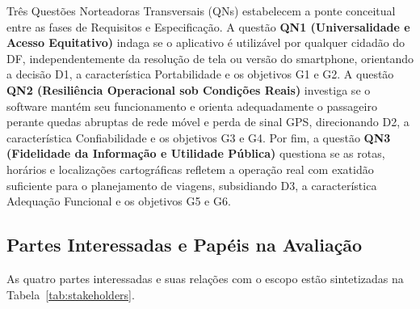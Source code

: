 \documentclass[11pt,a4paper]{article}
\begin{document}
Três Questões Norteadoras Transversais (QNs) estabelecem a ponte conceitual entre as fases de Requisitos e Especificação. A questão \textbf{QN1 (Universalidade e Acesso Equitativo)} indaga se o aplicativo é utilizável por qualquer cidadão do DF, independentemente da resolução de tela ou versão do smartphone, orientando a decisão D1, a característica Portabilidade e os objetivos G1 e G2. A questão \textbf{QN2 (Resiliência Operacional sob Condições Reais)} investiga se o software mantém seu funcionamento e orienta adequadamente o passageiro perante quedas abruptas de rede móvel e perda de sinal GPS, direcionando D2, a característica Confiabilidade e os objetivos G3 e G4. Por fim, a questão \textbf{QN3 (Fidelidade da Informação e Utilidade Pública)} questiona se as rotas, horários e localizações cartográficas refletem a operação real com exatidão suficiente para o planejamento de viagens, subsidiando D3, a característica Adequação Funcional e os objetivos G5 e G6.

\subsection{Partes Interessadas e Papéis na Avaliação}
\label{sec:stakeholders}

As quatro partes interessadas e suas relações com o escopo estão sintetizadas na Tabela~\ref{tab:stakeholders}.
\end{document}
